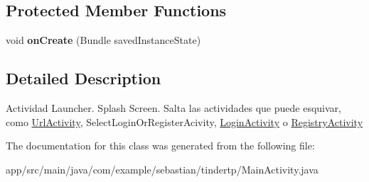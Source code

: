 \subsection*{Protected Member Functions}
\begin{DoxyCompactItemize}
\item 
void {\bfseries on\+Create} (Bundle saved\+Instance\+State)\hypertarget{classcom_1_1example_1_1sebastian_1_1tindertp_1_1MainActivity_a2d817b83c55535264e02e3dcc4e50b87}{}\label{classcom_1_1example_1_1sebastian_1_1tindertp_1_1MainActivity_a2d817b83c55535264e02e3dcc4e50b87}

\end{DoxyCompactItemize}


\subsection{Detailed Description}
Actividad Launcher. Splash Screen. Salta las actividades que puede esquivar, como \hyperlink{classcom_1_1example_1_1sebastian_1_1tindertp_1_1UrlActivity}{Url\+Activity}, Select\+Login\+Or\+Register\+Acivity, \hyperlink{classcom_1_1example_1_1sebastian_1_1tindertp_1_1LoginActivity}{Login\+Activity} o \hyperlink{classcom_1_1example_1_1sebastian_1_1tindertp_1_1RegistryActivity}{Registry\+Activity} 

The documentation for this class was generated from the following file\+:\begin{DoxyCompactItemize}
\item 
app/src/main/java/com/example/sebastian/tindertp/Main\+Activity.\+java\end{DoxyCompactItemize}

